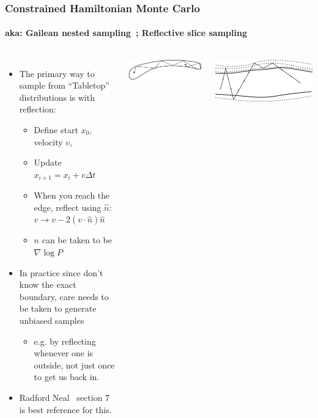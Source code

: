 \documentclass[aspectratio=169]{beamer}
\begin{document}
\begin{frame}
    \frametitle{Constrained Hamiltonian Monte Carlo~}
    \framesubtitle{aka: Gailean nested sampling~; Reflective slice sampling~}

    \begin{columns}
        \begin{itemize}
            \item The primary way to sample from ``Tabletop'' distributions is with reflection:
                \begin{itemize}
                    \item Define start $x_0$, velocity $v$,
                    \item Update $x_{i+1} = x_i + v \Delta t$
                    \item When you reach the edge, reflect using $\hat{n}$:
                        $ v \to v - 2 (v\cdot \hat{n}) \hat{n}$
                    \item $n$ can be taken to be $\nabla \log P$
                \end{itemize}
            \item In practice since don't know the exact boundary, care needs to be taken to generate unbiased samples 
                \begin{itemize}
                    \item e.g. by reflecting whenever one is outside, not just once to get us back in.
                \end{itemize}
            \item Radford Neal~ section 7 is best reference for this.
        \end{itemize}

        \includegraphics[width=\textwidth]{figures/reflect}
        \vspace{1em}

        \includegraphics[width=\textwidth]{figures/bounce}
    \end{columns}

\end{frame}
\end{document}
